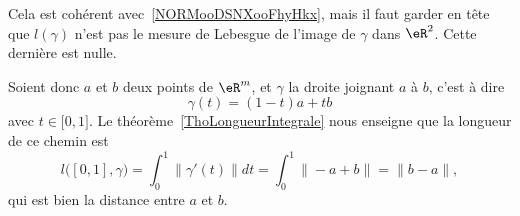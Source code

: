 \begin{remark}  \label{RemLongIntUn}
    Cela est cohérent avec~\ref{NORMooDSNXooFhyHkx}, mais il faut garder en tête que \( l(\gamma)\) n'est pas le mesure de Lebesgue de l'image de \( \gamma\) dans \( \eR^2\). Cette dernière est nulle.
\end{remark}

\begin{example}
Soient donc $a$ et $b$ deux points de $\eR^m$, et $\gamma$ la droite joignant $a$ à $b$, c'est à dire
\begin{equation}
    \gamma(t)=(1-t)a+tb
\end{equation}
avec $t\in\mathopen[ 0 , 1 \mathclose]$. Le théorème~\ref{ThoLongueurIntegrale} nous enseigne que la longueur de ce chemin est
\begin{equation}
    l\big( [0,1],\gamma \big)=\int_0^1\| \gamma'(t) \|dt=\int_0^1\| -a+b \|=\| b-a \|,
\end{equation}
qui est bien la distance entre $a$ et $b$.
\end{example}

